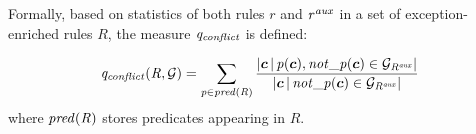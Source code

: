 Formally, based on statistics of both rules $r$ and $\mathit{r^{aux}}$ in a set of exception-enriched rules $R$, the measure $\mathit{q_{conflict}}$ is defined:

\begin{equation}
\mi{q_{conflict}(R,\cG)=\sum_{p\in pred(R)} \dfrac{|\vec{c}\,|\,p(\vec{c}),not\_p(\vec{c})\in \cG_{R^{\mi{aux}}}|}{|\vec{c}\,|\,not\_p(\vec{c})\in \cG_{R^{\mi{aux}}}|}}
\end{equation}
where $\mathit{pred(R)}$ stores predicates appearing in $R$.

